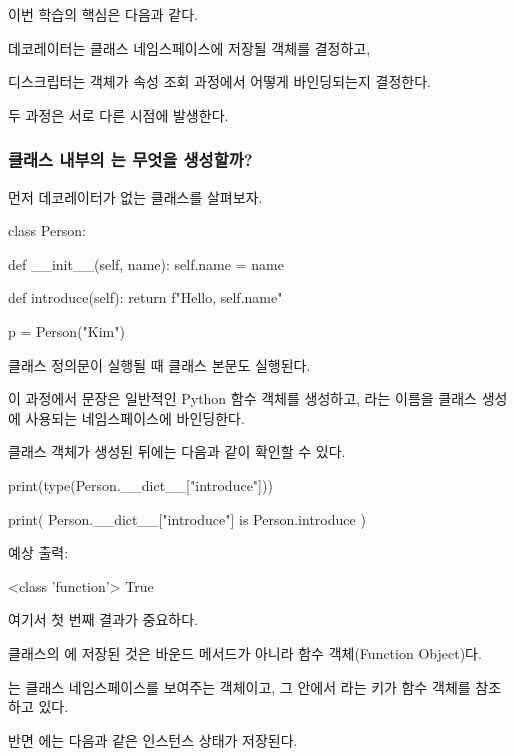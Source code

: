 이번 학습의 핵심은 다음과 같다.

\begin{dhksmry}[centered]
데코레이터는 클래스 네임스페이스에 저장될 객체를 결정하고,

디스크립터는 객체가 속성 조회 과정에서 어떻게 바인딩되는지 결정한다.
\end{dhksmry}

두 과정은 서로 다른 시점에 발생한다.

\subsubsection{클래스 내부의 는 무엇을 생성할까?}

먼저 데코레이터가 없는 클래스를 살펴보자.

\begin{dhkcode}
class Person:

    def __init__(self, name):
        self.name = name

    def introduce(self):
        return f"Hello, {self.name}"

p = Person("Kim")
\end{dhkcode}

클래스 정의문이 실행될 때 클래스 본문도 실행된다.

이 과정에서  문장은 일반적인 Python 함수 객체를 생성하고, 라는 이름을 클래스 생성에 사용되는 네임스페이스에 바인딩한다.

클래스 객체가 생성된 뒤에는 다음과 같이 확인할 수 있다.

\begin{dhkcode}
print(type(Person.__dict__["introduce"]))

print(
    Person.__dict__["introduce"]
    is Person.introduce
)
\end{dhkcode}

예상 출력:

\begin{dhkzsh}
<class 'function'>
True
\end{dhkzsh}

여기서 첫 번째 결과가 중요하다.

 클래스의 에 저장된 것은 바운드 메서드가 아니라 함수 객체(Function Object)다.

는 클래스 네임스페이스를 보여주는  객체이고, 그 안에서 라는 키가 함수 객체를 참조하고 있다.

반면 에는 다음과 같은 인스턴스 상태가 저장된다.

